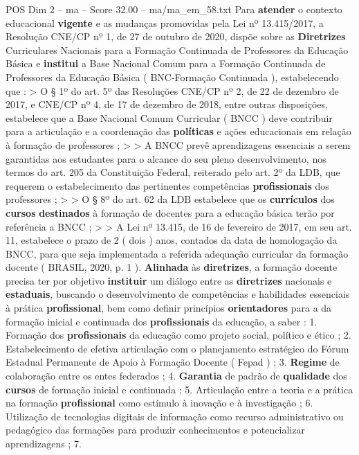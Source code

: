 \begin{textsample}{POS Dim 2 – ma – Score 32.00 – ma/ma\_em\_58.txt}
Para \textbf{atender} o contexto educacional \textbf{vigente} e as mudanças promovidas pela Lei nº 13.415/2017, a Resolução CNE/CP nº 1, de 27 de outubro de 2020, dispõe sobre as \textbf{Diretrizes} Curriculares Nacionais para a Formação Continuada de Professores da Educação Básica e \textbf{institui} a Base Nacional Comum para a Formação Continuada de Professores da Educação Básica ( BNC-Formação Continuada ), estabelecendo que : > O § 1º do art. 5º das Resoluções CNE/CP nº 2, de 22 de dezembro de 2017, e CNE/CP nº 4, de 17 de dezembro de 2018, entre outras disposições, estabelece que a Base Nacional Comum Curricular ( BNCC ) deve contribuir para a articulação e a coordenação das \textbf{políticas} e ações educacionais em relação à formação de professores ; > > A BNCC prevê aprendizagens essenciais a serem garantidas aos estudantes para o alcance do seu pleno desenvolvimento, nos termos do art. 205 da Constituição Federal, reiterado pelo art. 2º da LDB, que requerem o estabelecimento das pertinentes competências \textbf{profissionais} dos professores ; > > O § 8º do art. 62 da LDB estabelece que os \textbf{currículos} dos \textbf{cursos} \textbf{destinados} à formação de docentes para a educação básica terão por referência a BNCC ; > > A Lei nº 13.415, de 16 de fevereiro de 2017, em seu art. 11, estabelece o prazo de 2 ( dois ) anos, contados da data de homologação da BNCC, para que seja implementada a referida adequação curricular da formação docente ( BRASIL, 2020, p. 1 ). \textbf{Alinhada} às \textbf{diretrizes}, a formação docente precisa ter por objetivo \textbf{instituir} um diálogo entre as \textbf{diretrizes} nacionais e \textbf{estaduais}, buscando o desenvolvimento de competências e habilidades essenciais à prática \textbf{profissional}, bem como definir princípios \textbf{orientadores} para a da formação inicial e continuada dos \textbf{profissionais} da educação, a saber : 1.
Formação dos \textbf{profissionais} da educação como projeto social, político e ético ; 2.
Estabelecimento de efetiva articulação com o planejamento estratégico do Fórum Estadual Permanente de Apoio à Formação Docente ( Fepad ) ; 3. \textbf{Regime} de colaboração entre os entes federados ; 4. \textbf{Garantia} de padrão de \textbf{qualidade} dos \textbf{cursos} de formação inicial e continuada ; 5.
Articulação entre a teoria e a prática na formação \textbf{profissional} como estímulo à inovação e à investigação ; 6.
Utilização de tecnologias digitais de informação como recurso administrativo ou pedagógico das formações para produzir conhecimentos e potencializar aprendizagens ; 7.

\end{textsample}
